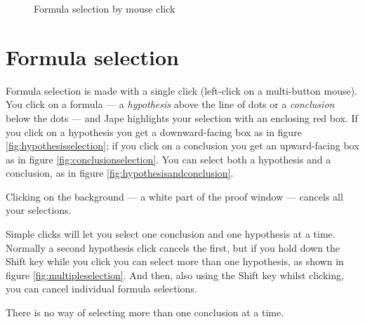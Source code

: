 \documentclass[11pt]{book}
\newcommand{\figref}[1]{figure \ref{fig:#1}}
\begin{document}
\begin{figure}
\quad
{}
\caption{Formula selection by mouse click}
\end{figure}

\section{Formula selection}
\label{sec:formulaselection}

Formula selection is made with a single click (left-click on a multi-button mouse). You click on a formula --- a \emph{hypothesis} above the line of dots or a \emph{conclusion} below the dots --- and Jape highlights your selection with an enclosing red box. If you click on a hypothesis you get a downward-facing box as in \figref{hypothesisselection}; if you click on a conclusion you get an upward-facing box as in \figref{conclusionselection}. You can select both a hypothesis and a conclusion, as in \figref{hypothesisandconclusion}.

Clicking on the background --- a white part of the proof window --- cancels all your selections.

Simple clicks will let you select one conclusion and one hypothesis at a time. Normally a second hypothesis click cancels the first, but if you hold down the Shift key while you click you can select more than one hypothesis, as shown in \figref{multipleselection}. And then, also using the Shift key whilst clicking, you can cancel individual formula selections.

There is no way of selecting more than one conclusion at a time.
\end{document}
